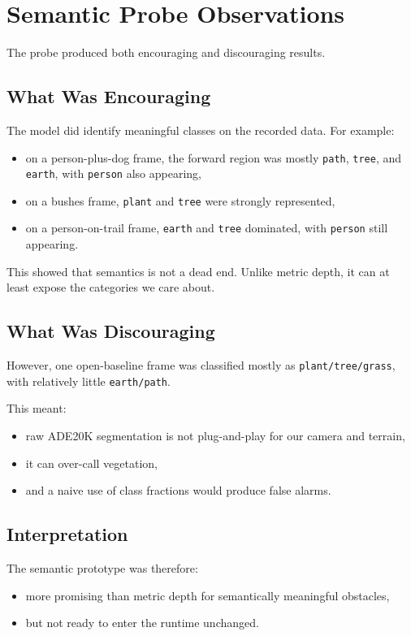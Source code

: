 \documentclass[11pt]{article}
\begin{document}
\section{Semantic Probe Observations}
The probe produced both encouraging and discouraging results.

\subsection{What Was Encouraging}
The model did identify meaningful classes on the recorded data. For example:
\begin{itemize}[leftmargin=*]
\item on a person-plus-dog frame, the forward region was mostly \texttt{path}, \texttt{tree}, and \texttt{earth}, with \texttt{person} also appearing,
\item on a bushes frame, \texttt{plant} and \texttt{tree} were strongly represented,
\item on a person-on-trail frame, \texttt{earth} and \texttt{tree} dominated, with \texttt{person} still appearing.
\end{itemize}

This showed that semantics is not a dead end. Unlike metric depth, it can at least expose the categories we care about.

\subsection{What Was Discouraging}
However, one open-baseline frame was classified mostly as \texttt{plant/tree/grass}, with relatively little \texttt{earth/path}.

This meant:
\begin{itemize}[leftmargin=*]
\item raw ADE20K segmentation is not plug-and-play for our camera and terrain,
\item it can over-call vegetation,
\item and a naive use of class fractions would produce false alarms.
\end{itemize}

\subsection{Interpretation}
The semantic prototype was therefore:
\begin{itemize}[leftmargin=*]
\item more promising than metric depth for semantically meaningful obstacles,
\item but not ready to enter the runtime unchanged.
\end{itemize}
\end{document}
